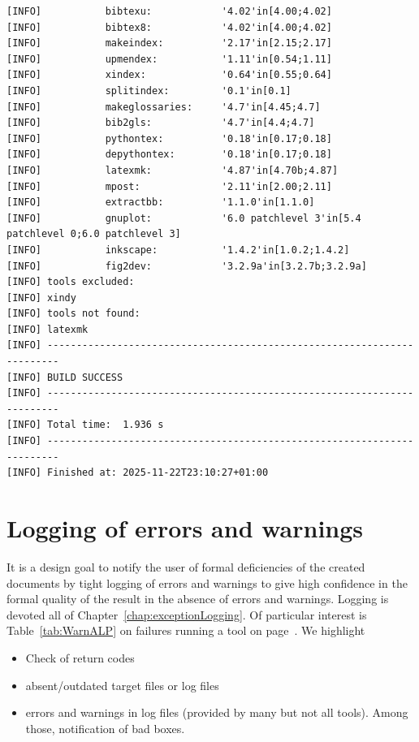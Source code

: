 \begin{lstlisting}[basicstyle=\tiny,
float, captionpos=b, label={lst:vrsOut}, 
caption={Output of goal \texttt{latex:vrs}}]
[INFO]           bibtexu:            '4.02'in[4.00;4.02]
[INFO]           bibtex8:            '4.02'in[4.00;4.02]
[INFO]           makeindex:          '2.17'in[2.15;2.17]
[INFO]           upmendex:           '1.11'in[0.54;1.11]
[INFO]           xindex:             '0.64'in[0.55;0.64]
[INFO]           splitindex:         '0.1'in[0.1]
[INFO]           makeglossaries:     '4.7'in[4.45;4.7]
[INFO]           bib2gls:            '4.7'in[4.4;4.7]
[INFO]           pythontex:          '0.18'in[0.17;0.18]
[INFO]           depythontex:        '0.18'in[0.17;0.18]
[INFO]           latexmk:            '4.87'in[4.70b;4.87]
[INFO]           mpost:              '2.11'in[2.00;2.11]
[INFO]           extractbb:          '1.1.0'in[1.1.0]
[INFO]           gnuplot:            '6.0 patchlevel 3'in[5.4 patchlevel 0;6.0 patchlevel 3]
[INFO]           inkscape:           '1.4.2'in[1.0.2;1.4.2]
[INFO]           fig2dev:            '3.2.9a'in[3.2.7b;3.2.9a]
[INFO] tools excluded: 
[INFO] xindy
[INFO] tools not found: 
[INFO] latexmk
[INFO] ------------------------------------------------------------------------
[INFO] BUILD SUCCESS
[INFO] ------------------------------------------------------------------------
[INFO] Total time:  1.936 s
[INFO] ------------------------------------------------------------------------
[INFO] Finished at: 2025-11-22T23:10:27+01:00
\end{lstlisting}


\section{Logging of errors and warnings}\label{sec:chkErrWarn}

It is a design goal to notify the user of formal deficiencies of the created documents 
by tight logging of errors and warnings 
to give high confidence in the formal quality of the result in the absence of errors and warnings. 
Logging is devoted all of Chapter~\ref{chap:exceptionLogging}. 
Of particular interest is Table~\ref{tab:WarnALP} on failures running a tool 
on page~\pageref{tab:WarnALP}. 
We highlight 
%
\begin{itemize}
  \item
  Check of return codes 
  \item
  absent/outdated target files or log files
  \item
  errors and warnings in log files (provided by many but not all tools). 
  Among those, notification of bad boxes. 
\end{itemize}



